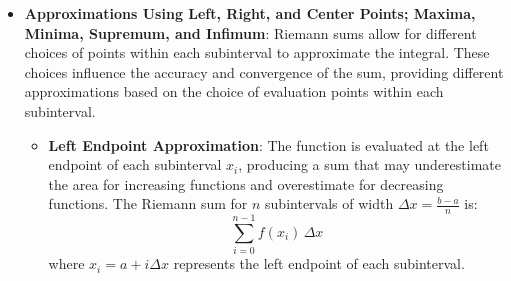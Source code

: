 \begin{itemize}
\begin{figure}[H]
\begin{center}
\caption{\textit{A Riemann Sum approximation for an integral of a function.}}
\end{center}
\end{figure}

\item \textbf{Approximations Using Left, Right, and Center Points; Maxima, Minima, Supremum, and Infimum}: 
Riemann sums allow for different choices of points within each subinterval to approximate the integral. These choices influence the accuracy and convergence of the sum, providing different approximations based on the choice of evaluation points within each subinterval.

\begin{itemize}
\item \textbf{Left Endpoint Approximation}: The function is evaluated at the left endpoint of each subinterval \( x_i \), producing a sum that may underestimate the area for increasing functions and overestimate for decreasing functions. The Riemann sum for \( n \) subintervals of width \( \Delta x = \frac{b - a}{n} \) is:
\[
\sum_{i=0}^{n-1} f(x_i) \, \Delta x
\]
where \( x_i = a + i \Delta x \) represents the left endpoint of each subinterval.


\end{itemize}
\end{itemize}
